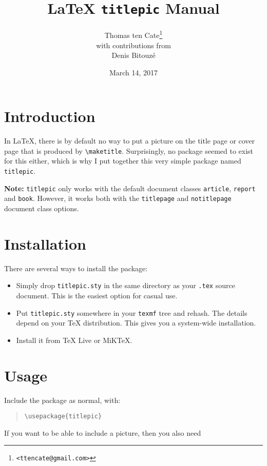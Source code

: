 \documentclass[titlepage]{article}
\title{\LaTeX{} \texttt{titlepic} Manual}
\author{
	Thomas ten Cate\thanks{\texttt{<ttencate@gmail.com>}} \\
	with contributions from \\
	Denis Bitouz\'e}
\date{March 14, 2017}
\begin{document}
\maketitle

\section{Introduction}

In \LaTeX, there is by default no way to put a picture on the title page or cover page that is produced by \verb$\maketitle$. Surprisingly, no package seemed to exist for this either, which is why I put together this very simple package named \verb$titlepic$.

\textbf{Note:} \verb$titlepic$ only works with the default document classes \verb$article$, \verb$report$ and \verb$book$. However, it works both with the \verb$titlepage$ and \verb$notitlepage$ document class options.

\section{Installation}

There are several ways to install the package:
\begin{itemize}
	\item Simply drop \verb$titlepic.sty$ in the same directory as your \verb$.tex$ source document. This is the easiest option for casual use.
	\item Put \verb$titlepic.sty$ somewhere in your \verb$texmf$ tree and rehash. The details depend on your \TeX{} distribution. This gives you a system-wide installation.
	\item Install it from \TeX{} Live or MiK\TeX.
\end{itemize}

\section{Usage}

Include the package as normal, with:

\begin{quote}
	\verb$\usepackage{titlepic}$
\end{quote}

\noindent If you want to be able to include a picture, then you also need
\end{document}
